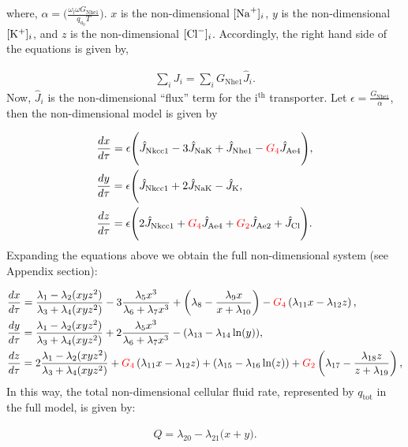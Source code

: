 \documentclass{svjour3}
\newcommand{\bkplus}{[{\rm K}^+]_i}
\newcommand{\bna}{[{\rm Na}^+]_i}
\newcommand{\bcl}{[{\rm Cl}^-]_i}
\begin{document}
where, $\alpha=\Big( \frac{ \omega_l  \omega G_{\text{Nhe1}}}{q_{a_0} T } \Big)$. $x$ is the non-dimensional $\bna$, $y$ is the non-dimensional $\bkplus$, and $z$ is the non-dimensional $\bcl$. Accordingly, the right hand side of the equations is given by,\par
\begin{align*}
\sum_i J_i = \sum_i G_{\text{Nhe1}} \hat{J}_i.
\end{align*}
Now, $\hat{J}_i$ is the non-dimensional ``flux'' term for the i$^{\text{th}}$ transporter. Let $\epsilon=\frac{G_{\text{Nhe1}}}{\alpha}$, then the non-dimensional model is given by \par
\begin{align*}
& \frac{dx}{d\tau}=\epsilon \Bigg( \hat{J}_{\text{Nkcc1}}-3\hat{J}_{\text{NaK}}+\hat{J}_{\text{Nhe1}}-{\color{red}G_4}\hat{J}_{\text{Ae4}}\Bigg),\\
&\frac{dy}{d\tau}=\epsilon\Bigg(\hat{J}_{\text{Nkcc1}}+2\hat{J}_{\text{NaK}}-\hat{J}_{\text{K}},\\
& \frac{dz}{d\tau}=\epsilon \Bigg( 2\hat{J}_{\text{Nkcc1}}+{\color{red}G_4}\hat{J}_{\text{Ae4}}+{\color{red}G_2}\hat{J}_{\text{Ae2}}+\hat{J}_{\text{Cl}}\Bigg).
\end{align*}
Expanding the equations above we obtain the full non-dimensional system (see Appendix section):\par
{\small  
\begin{align}
&\frac{dx}{d\tau}=\frac{\lambda_1-\lambda_2(xyz^2)}{\lambda_3+\lambda_4(xyz^2)}-3\frac{\lambda_5 x^3}			{\lambda_6+\lambda_7 x^3}+\left(\lambda_{8}-\frac{\lambda_{9}x}{x+\lambda_{10}}\right)-{\color{red}G_4}\left( \lambda_{11}x-\lambda_{12}z\right),\\
&\frac{dy}{d\tau}=\frac{\lambda_1-\lambda_2(xyz^2)}{\lambda_3+\lambda_4(xyz^2)}+2\frac{\lambda_5 x^3}{\lambda_6+\lambda_7 x^3}- (\lambda_{13}-\lambda_{14} \ln(y)),\\
&\frac{dz}{d\tau}=2\frac{\lambda_1-\lambda_2(xyz^2)}{\lambda_3+\lambda_4(xyz^2)}+{\color{red}G_4}	\left(\lambda_{11} x-\lambda_{12} z\right) + (\lambda_{15}-\lambda_{16}\ln(z))+{\color{red}G_2}\left(\lambda_{17}-\frac{\lambda_{18}z}{z+\lambda_{19}}\right),
\end{align}}
In this way, the total non-dimensional cellular fluid rate, represented by $q_{\text{tot}}$ in the full model, is given by:\par
\begin{align}
Q=\lambda_{20}-\lambda_{21} \Bigg( x + y \Bigg).
\end{align}
\end{document}
